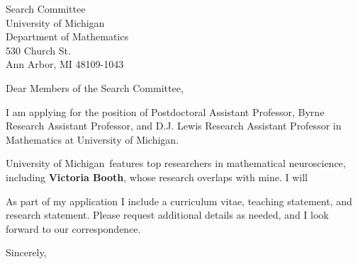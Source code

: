 \documentclass[11pt,a4paper]{letter}
\begin{document}

\def\School{University of Michigan}

\begin{letter}
{Search Committee\\
University of Michigan\\
Department of Mathematics\\
530 Church St.\\
Ann Arbor, MI 48109-1043}


\opening{Dear Members of the Search Committee,}

I am applying for the position of Postdoctoral Assistant Professor, Byrne Research Assistant Professor, and D.J. Lewis Research Assistant Professor in Mathematics at \School. 



\School~features top researchers in mathematical neuroscience, including \textbf{Victoria Booth}, whose research overlaps with mine. I will 



As part of my application I include a curriculum vitae, teaching statement, and research statement. Please request additional details as needed, and I look forward to our correspondence.

\closing{Sincerely,}
\end{letter}
\end{document}

